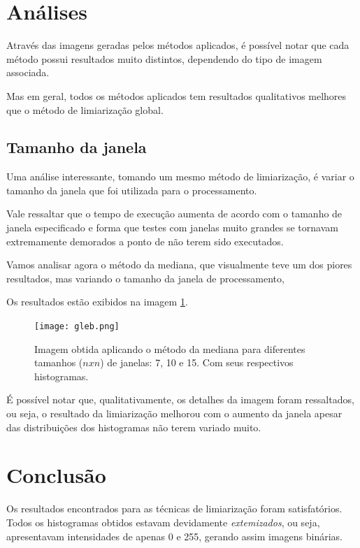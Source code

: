 \documentclass[conference]{IEEEtran}
\begin{document}
\section{Análises}

Através das imagens geradas pelos métodos aplicados, é possível notar que cada método possui resultados muito distintos, dependendo do tipo de imagem associada.

Mas em geral, todos os métodos aplicados tem resultados qualitativos melhores que o método de limiarização global.

\subsection{Tamanho da janela}

Uma análise interessante, tomando um mesmo método de limiarização, é variar o tamanho da janela que foi utilizada para o processamento.

Vale ressaltar que o tempo de execução aumenta de acordo com o tamanho de janela especificado e forma que testes com janelas muito grandes se tornavam extremamente demorados a ponto de não terem sido executados.

Vamos analisar agora o método da mediana, que visualmente teve um dos piores resultados, mas variando o tamanho da janela de processamento,

Os resultados estão exibidos na imagem \ref{fig:gleb}.

\begin{figure}[ht]
        \centering
        \texttt{[image: gleb.png]}
        \caption{Imagem obtida aplicando o método da mediana para diferentes tamanhos ($nxn$) de janelas: 7, 10 e 15. Com seus respectivos histogramas.}
        \label{fig:gleb}
    \end{figure}

É possível notar que, qualitativamente, os detalhes da imagem foram ressaltados, ou seja, o resultado da limiarização melhorou com o aumento da janela apesar das distribuições dos histogramas não terem variado muito.

 \section{Conclusão}
 Os resultados encontrados para as técnicas de limiarização foram satisfatórios. Todos os histogramas obtidos estavam devidamente \textit{extemizados}, ou seja, apresentavam intensidades de apenas 0 e 255, gerando assim imagens binárias.
\end{document}
